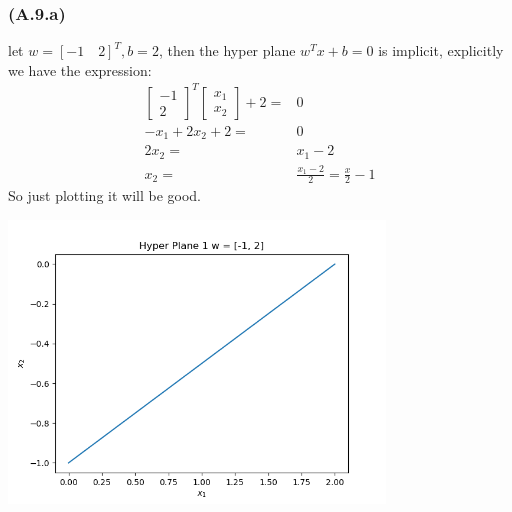 \documentclass[]{article}
\begin{document}
        \subsubsection*{(A.9.a)}
            let $w = [-1 \quad 2]^T, b = 2$, then the hyper plane $w^Tx + b = 0$ is implicit, explicitly we have the expression: 
            \begin{align*}\tag{1.9.a.1}\label{eqn:1.9.a.1}
                \begin{bmatrix}
                    - 1 \\ 2 
                \end{bmatrix}^T 
                \begin{bmatrix}
                    x_1 \\ x_2
                \end{bmatrix}
                + 2
                =&
                0
                \\
                -x_1 + 2x_2 + 2 =& 0
                \\
                2x_2 =& x_1 - 2
                \\
                x_2 =& \frac{x_1 - 2}{2} = \frac{x}{2} - 1
            \end{align*}
            So just plotting it will be good. 
            \begin{center}
                \includegraphics[width=10cm]{hyperplane1.png}
            \end{center}
            
\end{document}
